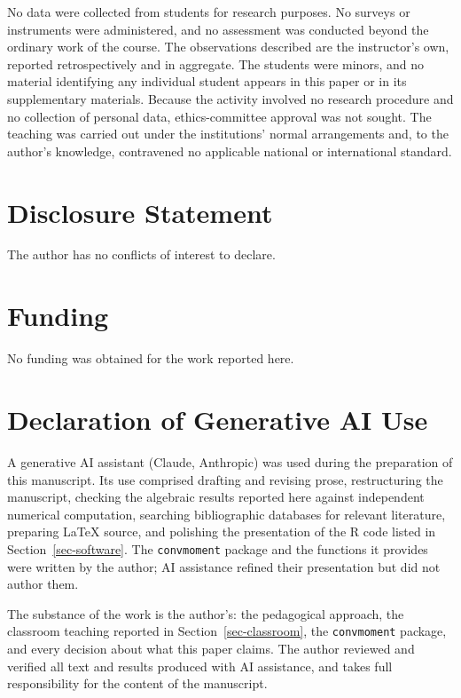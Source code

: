 \documentclass[
  12pt]{article}
\begin{document}
No data were collected from students for research purposes. No surveys or instruments were administered, and no assessment was conducted beyond the ordinary work of the course. The observations described are the instructor's own, reported retrospectively and in aggregate. The students were minors, and no material identifying any individual student appears in this paper or in its supplementary materials. Because the activity involved no research procedure and no collection of personal data, ethics-committee approval was not sought. The teaching was carried out under the institutions' normal arrangements and, to the author's knowledge, contravened no applicable national or international standard.

\section{Disclosure Statement}

The author has no conflicts of interest to declare.

\section{Funding}

No funding was obtained for the work reported here.

\section{Declaration of Generative AI Use}

A generative AI assistant (Claude, Anthropic) was used during the preparation of this manuscript. Its use comprised drafting and revising prose, restructuring the manuscript, checking the algebraic results reported here against independent numerical computation, searching bibliographic databases for relevant literature, preparing \LaTeX{} source, and polishing the presentation of the \textsf{R} code listed in Section~\ref{sec-software}. The \texttt{convmoment} package and the functions it provides were written by the author; AI assistance refined their presentation but did not author them.

The substance of the work is the author's: the pedagogical approach, the classroom teaching reported in Section~\ref{sec-classroom}, the \texttt{convmoment} package, and every decision about what this paper claims. The author reviewed and verified all text and results produced with AI assistance, and takes full responsibility for the content of the manuscript.
\end{document}
